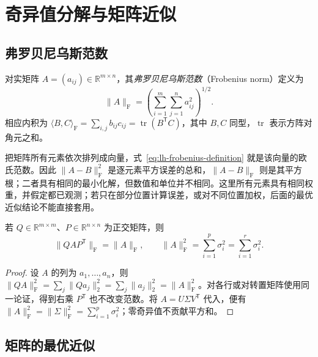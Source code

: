 \section{奇异值分解与矩阵近似}
\label{sec:lh-svd-approximation}

\subsection{弗罗贝尼乌斯范数}
\label{subsec:lh-svd-frobenius}

\begin{definition}[弗罗贝尼乌斯范数]
\label{def:lh-frobenius-norm}
对实矩阵 $A=(a_{ij})\in\mathbb R^{m\times n}$，其\emph{弗罗贝尼乌斯范数}（Frobenius norm）定义为
\begin{equation}
\|A\|_{\mathrm F}=\left(\sum_{i=1}^m\sum_{j=1}^n a_{ij}^2\right)^{1/2}.
\label{eq:lh-frobenius-definition}
\end{equation}
相应内积为 $\langle B,C\rangle_{\mathrm F}=\sum_{i,j}b_{ij}c_{ij}=\operatorname{tr}(B^{\mathsf T}C)$，其中 $B,C$ 同型，$\operatorname{tr}$ 表示方阵对角元之和。
\end{definition}

把矩阵所有元素依次排列成向量，式~\eqref{eq:lh-frobenius-definition} 就是该向量的欧氏范数。因此 $\|A-B\|_{\mathrm F}^2$ 是逐元素平方误差的总和，$\|A-B\|_{\mathrm F}$ 则是其平方根；二者具有相同的最小化解，但数值和单位并不相同。这里所有元素具有相同权重，并假定都已观测；若只在部分位置计算误差，或对不同位置加权，后面的最优近似结论不能直接套用。

\begin{lemma}[正交不变性与奇异值表示]
\label{lem:lh-frobenius-orthogonal-invariance}
若 $Q\in\mathbb R^{m\times m}$、$P\in\mathbb R^{n\times n}$ 为正交矩阵，则
\begin{equation}
\|QAP^{\mathsf T}\|_{\mathrm F}=\|A\|_{\mathrm F},\qquad
\|A\|_{\mathrm F}^2=\sum_{i=1}^p\sigma_i^2=\sum_{i=1}^r\sigma_i^2.
\label{eq:lh-frobenius-singular-values}
\end{equation}
\end{lemma}
\begin{proof}
设 $A$ 的列为 $a_1,\ldots,a_n$，则 $\|QA\|_{\mathrm F}^2=\sum_j\|Qa_j\|_2^2=\sum_j\|a_j\|_2^2=\|A\|_{\mathrm F}^2$。对各行或对转置矩阵使用同一论证，得到右乘 $P^{\mathsf T}$ 也不改变范数。将 $A=U\Sigma V^{\mathsf T}$ 代入，便有 $\|A\|_{\mathrm F}^2=\|\Sigma\|_{\mathrm F}^2=\sum_{i=1}^p\sigma_i^2$；零奇异值不贡献平方和。
\end{proof}

\subsection{矩阵的最优近似}
\label{subsec:lh-svd-best-approximation}

